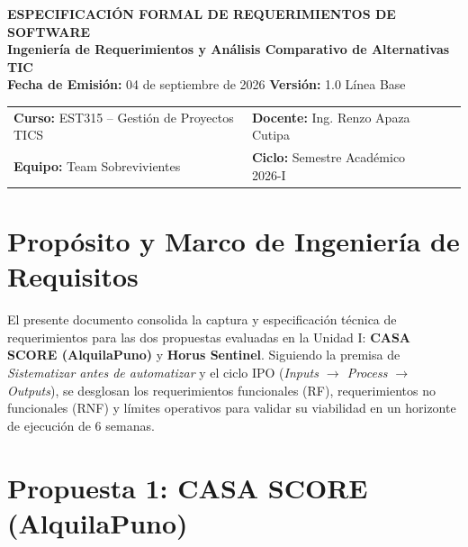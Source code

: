 \documentclass[11pt,a4paper]{article}
\begin{document}

\begin{center}
    {\Large \textbf{\textcolor{AzulUNA}{ESPECIFICACIÓN FORMAL DE REQUERIMIENTOS DE SOFTWARE}}}\\[3pt]
    {\normalsize \textbf{Ingeniería de Requerimientos y Análisis Comparativo de Alternativas TIC}}\\[4pt]
    \footnotesize \textbf{Fecha de Emisión:} 04 de septiembre de 2026 \quad \textbar\quad \textbf{Versión:} 1.0 Línea Base
\end{center}

\vspace{0.1cm}

\noindent\begin{tabularx}{\textwidth}{@{}llXX@{}}
\toprule
\textbf{Curso:} EST315 -- Gestión de Proyectos TICS & \textbf{Docente:} Ing. Renzo Apaza Cutipa \\
\textbf{Equipo:} Team Sobrevivientes & \textbf{Ciclo:} Semestre Académico 2026-I \\
\bottomrule
\end{tabularx}

\vspace{0.2cm}

\section{Propósito y Marco de Ingeniería de Requisitos}
El presente documento consolida la captura y especificación técnica de requerimientos para las dos propuestas evaluadas en la Unidad I: \textbf{CASA SCORE (AlquilaPuno)} y \textbf{Horus Sentinel}. Siguiendo la premisa de \textit{Sistematizar antes de automatizar} y el ciclo IPO (\textit{Inputs $\rightarrow$ Process $\rightarrow$ Outputs}), se desglosan los requerimientos funcionales (RF), requerimientos no funcionales (RNF) y límites operativos para validar su viabilidad en un horizonte de ejecución de 6 semanas.

\section{Propuesta 1: CASA SCORE (AlquilaPuno)}
\end{document}
